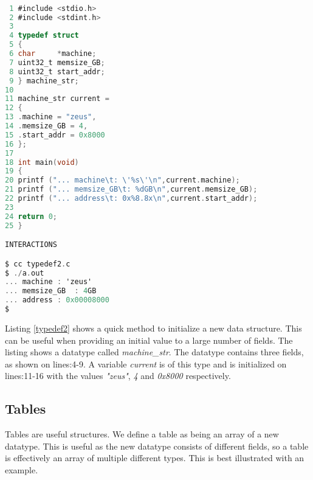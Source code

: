 \begin{lstlisting}[language=C,showstringspaces=false,caption={File: typedef2.c, initializer},captionpos=b,label=typedef2]

 1 #include <stdio.h>
 2 #include <stdint.h>
 3 
 4 typedef struct 
 5 {
 6 char     *machine;
 7 uint32_t memsize_GB;
 8 uint32_t start_addr;
 9 } machine_str;
10 
11 machine_str current =
12 {
13 .machine = "zeus",
14 .memsize_GB = 4,
15 .start_addr = 0x8000
16 };
17 
18 int main(void)
19 {
20 printf ("... machine\t: \'%s\'\n",current.machine);
21 printf ("... memsize_GB\t: %dGB\n",current.memsize_GB);
22 printf ("... address\t: 0x%8.8x\n",current.start_addr);
23 
24 return 0;
25 }

INTERACTIONS

$ cc typedef2.c
$ ./a.out
... machine	: 'zeus'
... memsize_GB	: 4GB
... address	: 0x00008000
$

\end{lstlisting}

Listing \ref{typedef2} shows a quick method to initialize a new data structure. This can be useful when providing an initial value to a large number of fields. The listing shows a datatype called \textit{machine\_str}. The datatype contains three fields, as shown on lines:4-9. A variable \textit{current} is of this type and is initialized on lines:11-16 with the values \textit{"zeus"}, \textit{4} and \textit{0x8000} respectively. 

\subsection{Tables}

Tables are useful structures. We define a table as being an array of a new datatype. This is useful as the new datatype consists of different fields, so a table is effectively an array of multiple different types. This is best illustrated with an example.

